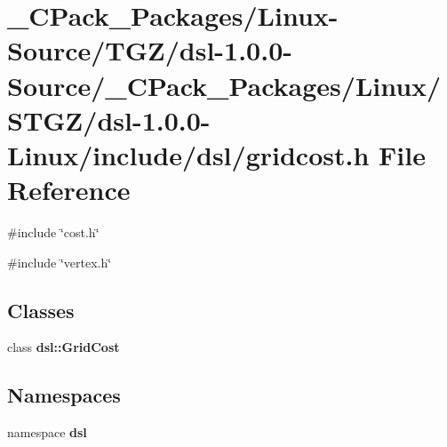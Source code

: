 \section{\_\-CPack\_\-Packages/Linux-\/Source/TGZ/dsl-\/1.0.0-\/Source/\_\-CPack\_\-Packages/Linux/STGZ/dsl-\/1.0.0-\/Linux/include/dsl/gridcost.h File Reference}
\label{__CPack__Packages_2Linux-Source_2TGZ_2dsl-1_80_80-Source_2__CPack__Packages_2Linux_2STGZ_2dsl-1_4262f7138966e077f7db34ed021542bb}
{\ttfamily \#include \char`\"{}cost.h\char`\"{}}\par
{\ttfamily \#include \char`\"{}vertex.h\char`\"{}}\par
\subsection*{Classes}
\begin{DoxyCompactItemize}
\item 
class {\bf dsl::GridCost}
\end{DoxyCompactItemize}
\subsection*{Namespaces}
\begin{DoxyCompactItemize}
\item 
namespace {\bf dsl}
\end{DoxyCompactItemize}
